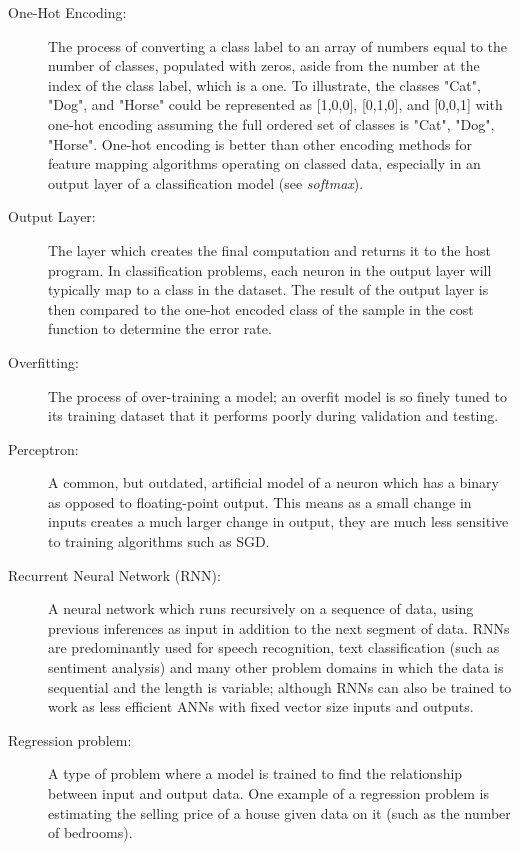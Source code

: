 \documentclass[]{report}
\begin{document}
\begin{description}
\item[One-Hot Encoding:] The process of converting a class label to an array of numbers equal to the number of classes, populated with zeros, aside from the number at the index of the class label, which is a one. To illustrate, the classes "Cat", "Dog", and "Horse" could be represented as [1,0,0], [0,1,0], and [0,0,1] with one-hot encoding assuming the full ordered set of classes is {"Cat", "Dog", "Horse"}. One-hot encoding is better than other encoding methods for feature mapping algorithms operating on classed data, especially in an output layer of a classification model (see \emph{softmax}).

\item[Output Layer:] The layer which creates the final computation and returns it to the host program. In classification problems, each neuron in the output layer will typically map to a class in the dataset. The result of the output layer is then compared to the one-hot encoded class of the sample in the cost function to determine the error rate.

\item[Overfitting:] The process of over-training a model; an overfit model is so finely tuned to its training dataset that it performs poorly during validation and testing.

\item[Perceptron:] A common, but outdated, artificial model of a neuron which has a binary as opposed to floating-point output. This means as a small change in inputs creates a much larger change in output, they are much less sensitive to training algorithms such as SGD.

\item[Recurrent Neural Network (RNN):] A neural network which runs recursively on a sequence of data, using previous inferences as input in addition to the next segment of data. RNNs are predominantly used for speech recognition, text classification (such as sentiment analysis) and many other problem domains in which the data is sequential and the length is variable; although RNNs can also be trained to work as less efficient ANNs with fixed vector size inputs and outputs.

\item[Regression problem:] A type of problem where a model is trained to find the relationship between input and output data. One example of a regression problem is estimating the selling price of a house given data on it (such as the number of bedrooms).	


\end{description}
\end{document}
